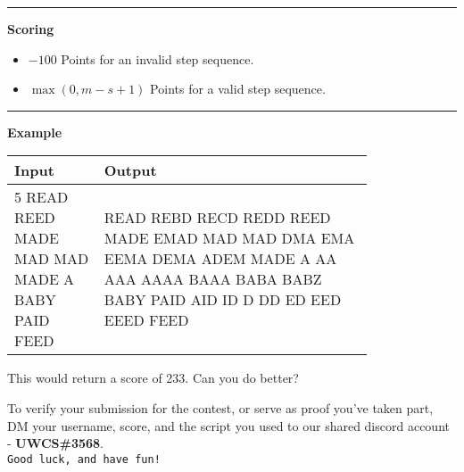 \vspace{8pt}
\hrule

\textbf{Scoring}

\begin{itemize}
    \item $-100$ Points for an invalid step sequence.
    \item $\max{\left(0, m - s + 1\right)}$ Points for a valid step sequence.
\end{itemize}

\vspace{8pt}
\hrule

\textbf{Example}

\begin{table}[h]
    \centering
    \begin{tabular}{|p{0.2\linewidth}|p{0.6\linewidth}|}
        \hline
        Input & Output \\
        \hline
        5 \newline READ REED \newline MADE MAD \newline MAD MADE \newline A BABY \newline PAID FEED & 
        \text{} \newline READ REBD RECD REDD REED \newline MADE EMAD MAD \newline MAD DMA EMA EEMA DEMA ADEM MADE \newline A AA AAA AAAA BAAA BABA BABZ BABY \newline PAID AID ID D DD ED EED EEED FEED \\
        \hline
    \end{tabular}
\end{table}

This would return a score of 233. Can you do better?

To verify your submission for the contest, or serve as proof you've taken part, DM your username, score, and the script you used to our shared discord account - \textbf{UWCS\#3568}.
\\ \texttt{Good luck, and have fun!}